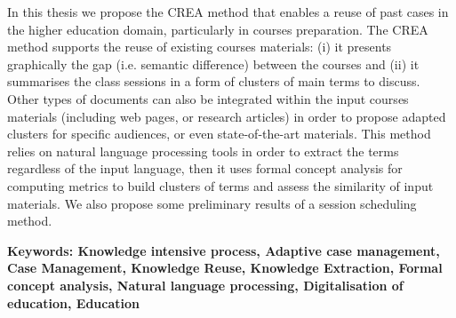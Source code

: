 In this thesis we propose the CREA method that enables a reuse of past cases in the higher education domain, particularly in courses preparation.
The CREA method supports the reuse of existing courses materials: (i) it presents graphically the gap (i.e. semantic difference) between the courses and (ii) it summarises the class sessions in a form of clusters of main terms to discuss.
Other types of documents can also be integrated within the input courses materials (including web pages, or research articles) in order to propose adapted clusters for specific audiences, or even state-of-the-art materials.
This method relies on natural language processing tools in order to extract the terms regardless of the input language, then it uses formal concept analysis for computing metrics to build clusters of terms and assess the similarity of input materials.
We also propose some preliminary results of a session scheduling method.



\bigskip

\textbf{Keywords:
Knowledge intensive process,
Adaptive case management,
Case Management,
Knowledge Reuse,
Knowledge Extraction,
Formal concept analysis,
Natural language processing,
Digitalisation of education,
Education}

\shorthandon{:} %

